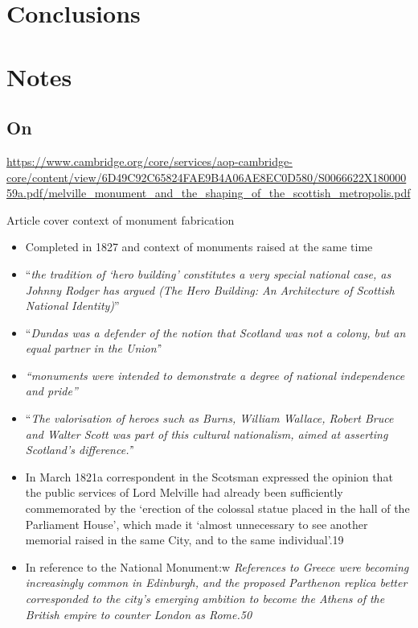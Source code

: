 \documentclass{scrartcl}
\begin{document}
\section{Conclusions}
    
\section{Notes}

\subsection{On \cite{godard_2018}}

\url{https://www.cambridge.org/core/services/aop-cambridge-core/content/view/6D49C92C65824FAE9B4A06AE8EC0D580/S0066622X18000059a.pdf/melville_monument_and_the_shaping_of_the_scottish_metropolis.pdf}

Article cover context of monument fabrication
\begin{itemize}
    \item Completed in 1827 and context of monuments raised at the same time
    \item ``\textit{the tradition of ‘hero building’ constitutes a very special national case, as Johnny Rodger has argued (The Hero Building: An Architecture of Scottish National Identity)}''
    \item ``\textit{Dundas was a defender of the notion that Scotland was not a colony, but an equal partner in the Union'}'
    \item \textit{``monuments were intended to demonstrate a degree of national independence and pride''}
    \item ``\textit{The valorisation of heroes such as Burns, William Wallace, Robert Bruce and Walter Scott was part of this cultural nationalism, aimed at asserting Scotland’s difference.'}'
    \item In March 1821a correspondent in the Scotsman expressed the opinion that the public services of Lord Melville had already been sufficiently commemorated by the ‘erection of the colossal statue placed in the hall of the Parliament House’, which made it ‘almost unnecessary to see another memorial raised in the same City, and to the same individual’.19 
    \item In reference to the National Monument:w \textit{References to Greece were becoming increasingly common in Edinburgh, and the proposed Parthenon replica better corresponded to the city’s emerging ambition to become the Athens of the British empire to counter London as Rome.50}
\end{itemize}
\end{document}
